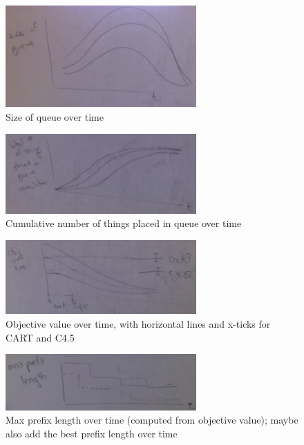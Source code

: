 \begin{figure}[t!]
\begin{center}
\includegraphics[width=0.65\textwidth]{figs/sketch-queue-size.png}
\end{center}
\caption{Size of queue over time}
\label{fig:queue-size}
\end{figure}

\begin{figure}[t!]
\begin{center}
\includegraphics[width=0.65\textwidth]{figs/sketch-queue-cumulative.png}
\end{center}
\caption{Cumulative number of things placed in queue over time}
\label{fig:queue-cumulative}
\end{figure}

\begin{figure}[t!]
\begin{center}
\includegraphics[width=0.65\textwidth]{figs/sketch-objective.png}
\end{center}
\caption{Objective value over time,
with horizontal lines and x-ticks for CART and C4.5}
\label{fig:objective}
\end{figure}

\begin{figure}[t!]
\begin{center}
\includegraphics[width=0.65\textwidth]{figs/sketch-max-length.png}
\end{center}
\caption{Max prefix length over time (computed from objective value);
maybe also add the best prefix length over time}
\label{fig:max-length}
\end{figure}
